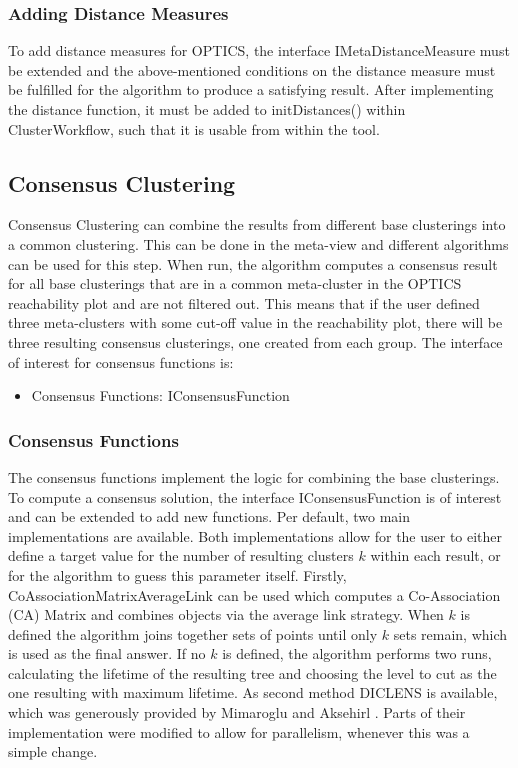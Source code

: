 \documentclass[
	a4paper,
	english,
	twoside,
	openright,               
	11pt                            
	]{report}
\begin{document}
\subsubsection*{Adding Distance Measures}
To add distance measures for OPTICS, the interface IMetaDistanceMeasure must be extended and the above-mentioned conditions on the distance measure must be fulfilled for the algorithm to produce a satisfying result. After implementing the distance function, it must be added to initDistances() within ClusterWorkflow, such that it is usable from within the tool.

\subsection{Consensus Clustering}
Consensus Clustering can combine the results from different base clusterings into a common clustering. This can be done in the meta-view and different algorithms can be used for this step. When run, the algorithm computes a consensus result for all base clusterings that are in a common meta-cluster in the OPTICS reachability plot and are not filtered out. This means that if the user defined three meta-clusters with some cut-off value in the reachability plot, there will be three resulting consensus clusterings, one created from each group. The interface of interest for consensus functions is:

\begin{itemize}
  \item Consensus Functions: IConsensusFunction
\end{itemize}

\subsubsection{Consensus Functions}
The consensus functions implement the logic for combining the base clusterings. To compute a consensus solution, the interface IConsensusFunction is of interest and can be extended to add new functions. Per default, two main implementations are available. Both implementations allow for the user to either define a target value for the number of resulting clusters $k$ within each result, or for the algorithm to guess this parameter itself. Firstly, CoAssociationMatrixAverageLink can be used which computes a Co-Association (CA) Matrix and combines objects via the average link strategy. When $k$ is defined the algorithm joins together sets of points until only $k$ sets remain, which is used as the final answer. If no $k$ is defined, the algorithm performs two runs, calculating the lifetime \cite{lifetime} of the resulting tree and choosing the level to cut as the one resulting with maximum lifetime. As second method DICLENS is available, which was generously provided by Mimaroglu and Aksehirl \cite{DICLENS}. Parts of their implementation were modified to allow for parallelism, whenever this was a simple change.
\end{document}
